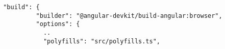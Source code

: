 \begin{verbatim}
 "build": {
          "builder": "@angular-devkit/build-angular:browser",
          "options": {
            ..
            "polyfills": "src/polyfills.ts",
\end{verbatim}
